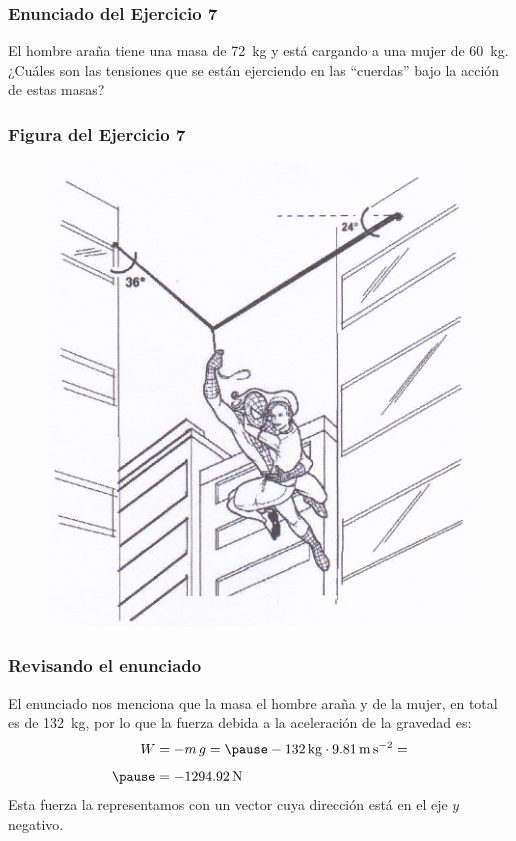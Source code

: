 \documentclass[12pt]{beamer}
\begin{document}
\begin{frame}
\frametitle{Enunciado del Ejercicio 7}
El hombre araña tiene una masa de \SI{72}{\kilo\gram} y está cargando a una mujer de \SI{60}{\kilo\gram}.
\\
\bigskip
\pause
¿Cuáles son las tensiones que se están ejerciendo en las \enquote{cuerdas} bajo la acción de estas masas?
\end{frame}
\begin{frame}
\frametitle{Figura del Ejercicio 7}
\begin{figure}
    \centering
    \includegraphics[scale=0.81]{Imagenes/DCL_Problema_07.png}
\end{figure}
\end{frame}
\begin{frame}
\frametitle{Revisando el enunciado}
El enunciado nos menciona que la masa el hombre araña y de la mujer, en total es de \SI{132}{\kilo\gram}, por lo que la fuerza debida a la aceleración de la gravedad es:
\pause
\begin{eqnarray*}
\begin{aligned}
W &= - m \, g = \pause - \SI{132}{\kilogram} \cdot \SI{9.81}{\meter\per\square\second} = \\[0.5em] \pause
&= - \SI{1294.92}{\newton}
\end{aligned}
\end{eqnarray*}
\pause
Esta fuerza la representamos con un vector cuya dirección está en el eje $y$ negativo.
\end{frame}
\end{document}
